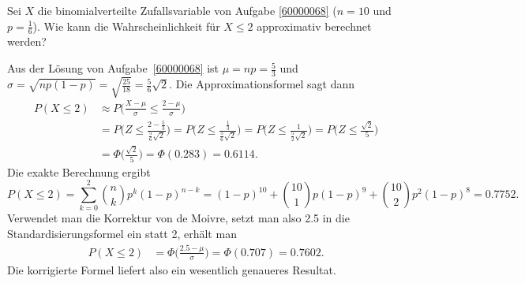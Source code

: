 Sei $X$ die binomialverteilte Zufallsvariable von Aufgabe \ref{60000068}
($n=10$ und $p=\frac16$).
Wie kann die Wahrscheinlichkeit für $X\le 2$ approximativ berechnet
werden?

\begin{loesung}
Aus der Lösung von Aufgabe~\ref{60000068} ist $\mu=np=\frac53$ und
$\sigma=\!\sqrt{np(1-p)}=\!\sqrt{\frac{25}{18}}=\frac{5}{6}\sqrt{2}$.
Die Approximationsformel sagt dann
\begin{align*}
P(X\le 2)
&\approx
P\biggl(
\frac{X-\mu}{\sigma}
\le
\frac{2-\mu}{\sigma}
\biggr)
\\
&=
P\biggl(Z \le \frac{2-\frac53}{\frac56\sqrt{2}}\biggr)
=
P\biggl(Z \le \frac{\frac13}{\frac56\sqrt{2}}\biggr)
=
P\biggl(Z \le \frac{1}{\frac52\sqrt{2}}\biggr)
=
P\biggl(Z \le \frac{\!\sqrt{2}}{5}\biggr)
\\
&=
\Phi\biggl( \frac{\!\sqrt{2}}{5}\biggr)
=
\Phi(0.283)
=
0.6114.
\end{align*}
Die exakte Berechnung ergibt
\[
P(X\le 2)
=
\sum_{k=0}^2
\binom{n}{k}p^k(1-p)^{n-k}
=
(1-p)^10
+
\binom{10}{1}
p(1-p)^9
+
\binom{10}{2}
p^2(1-p)^8
=
0.7752.
\]
Verwendet man die Korrektur von de Moivre, setzt man also 2.5 in die
Standardisierungsformel ein statt 2, erhält man
\begin{align*}
P(X\le 2)
&=
\Phi\biggl( \frac{2.5-\mu}{\sigma}\biggr)
=
\Phi(0.707)
=
0.7602.
\end{align*}
Die korrigierte Formel liefert also ein wesentlich genaueres Resultat.
\end{loesung}


